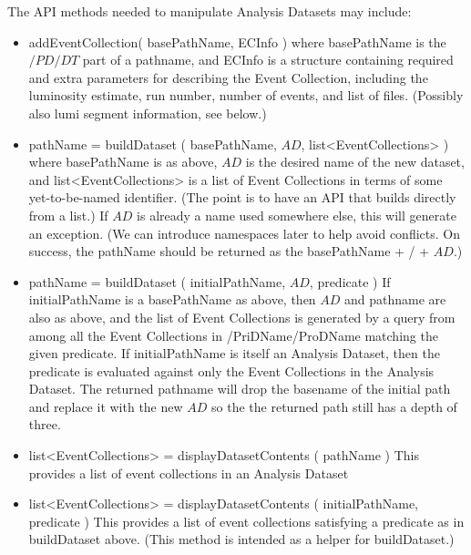 \documentclass{cmspaper}
\begin{document}
  The API methods needed to manipulate Analysis Datasets may include: 
\begin{itemize}
\item addEventCollection( basePathName, ECInfo ) 
       where basePathName is the $/PD/DT$ part of a pathname, and ECInfo 
       is a structure containing required and extra parameters for describing 
       the Event Collection, including the luminosity estimate, run number, 
       number of events, and list of files.  (Possibly also lumi segment 
       information, see below.) 

\item pathName = buildDataset ( basePathName, $AD$, list<EventCollections> )
       where basePathName is as above, $AD$ is the desired name of the new
       dataset,  and list<EventCollections> is a list of Event Collections in 
       terms of some yet-to-be-named identifier.  (The point is to have an API 
       that builds directly from a list.)  If $AD$ is already a name used 
       somewhere else, this will generate an exception.   (We can introduce 
       namespaces later to help avoid conflicts.  On success, the pathName should 
       be returned as the basePathName + / + $AD$.) 

\item  pathName = buildDataset ( initialPathName, $AD$, predicate )
       If initialPathName is a basePathName as above, then $AD$ and pathname 
       are also as above, and the list of Event Collections is generated by a
       query from among all the Event Collections in /PriDName/ProDName matching 
       the given predicate.  If initialPathName is itself an Analysis Dataset, 
       then the predicate is evaluated against only the Event Collections in the
       Analysis Dataset.  The returned pathname will drop the basename of the 
       initial path and replace it with the new $AD$ so the the returned path 
       still has a depth of three.  

\item  list<EventCollections> = displayDatasetContents ( pathName ) 
       This provides a list of event collections in an Analysis Dataset 

\item  list<EventCollections> = displayDatasetContents ( initialPathName, predicate ) 
       This provides a list of event collections satisfying a predicate as in 
       buildDataset above.  (This method is intended as a helper for 
       buildDataset.) 


\end{itemize}
\end{document}

